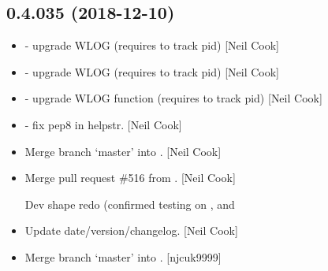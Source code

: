 \documentclass[a4paper,10pt,english]{report}
\begin{document}
\subsection{0.4.035 (2018-12-10)}
\label{\detokenize{misc/changelog:id242}}\begin{itemize}
\item {} 
 - upgrade WLOG (requires  to track pid)
{[}Neil Cook{]}

\item {} 
 - upgrade WLOG (requires  to track pid)
{[}Neil Cook{]}

\item {} 
 - upgrade WLOG function (requires  to track
pid) {[}Neil Cook{]}

\item {} 
 - fix pep8 in helpstr. {[}Neil Cook{]}

\item {} 
Merge branch ‘master’ into . {[}Neil Cook{]}

\item {} 
Merge pull request \#516 from . {[}Neil Cook{]}

Dev shape redo (confirmed testing on ,  and 

\item {} 
Update date/version/changelog. {[}Neil Cook{]}

\item {} 
Merge branch ‘master’ into . {[}njcuk9999{]}

\end{itemize}
\end{document}
